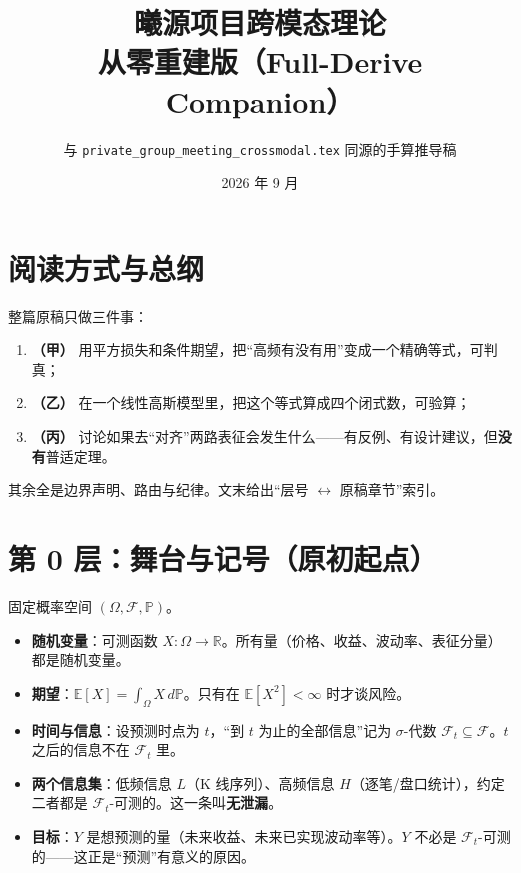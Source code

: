 \documentclass[UTF8,11pt,a4paper]{ctexart}
\title{曦源项目跨模态理论\\从零重建版（Full-Derive Companion）}
\author{与 \texttt{private\_group\_meeting\_crossmodal.tex} 同源的手算推导稿}
\date{2026 年 9 月}
\newcommand{\E}{\mathbb{E}}
\begin{document}
\maketitle

\begin{center}
\end{center}

\section*{阅读方式与总纲}

整篇原稿只做三件事：
\begin{enumerate}
  \item \textbf{（甲）} 用平方损失和条件期望，把``高频有没有用''变成一个精确等式，可判真；
  \item \textbf{（乙）} 在一个线性高斯模型里，把这个等式算成四个闭式数，可验算；
  \item \textbf{（丙）} 讨论如果去``对齐''两路表征会发生什么——有反例、有设计建议，但\textbf{没有}普适定理。
\end{enumerate}
其余全是边界声明、路由与纪律。文末给出``层号 $\leftrightarrow$ 原稿章节''索引。

\section{第 0 层：舞台与记号（原初起点）}

固定概率空间 $(\Omega,\mathcal F,\mathbb P)$。

\begin{itemize}
  \item \textbf{随机变量}：可测函数 $X:\Omega\to\mathbb R$。所有量（价格、收益、波动率、表征分量）都是随机变量。
  \item \textbf{期望}：$\E[X]=\int_\Omega X\,d\mathbb P$。只有在 $\E[X^2]<\infty$ 时才谈风险。
  \item \textbf{时间与信息}：设预测时点为 $t$，``到 $t$ 为止的全部信息''记为 $\sigma$-代数 $\mathcal F_t\subseteq\mathcal F$。$t$ 之后的信息不在 $\mathcal F_t$ 里。
  \item \textbf{两个信息集}：低频信息 $L$（K 线序列）、高频信息 $H$（逐笔/盘口统计），约定二者都是 $\mathcal F_t$-可测的。这一条叫\textbf{无泄漏}。
  \item \textbf{目标}：$Y$ 是想预测的量（未来收益、未来已实现波动率等）。$Y$ 不必是 $\mathcal F_t$-可测的——这正是``预测''有意义的原因。
\end{itemize}
\end{document}

